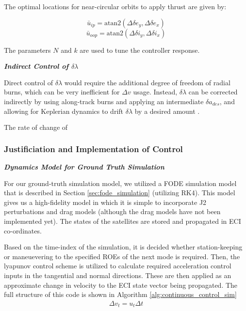The optimal locations for near-circular orbits to apply thrust are given by:

\[
\bar{u}_{ip} = \text{atan2} \left( \Delta \delta e_y, \Delta \delta e_x \right)
\]
\[
\bar{u}_{oop} = \text{atan2} \left( \Delta \delta i_y, \Delta \delta i_x \right)
\]

The parameters $N$ and $k$ are used to tune the controller response. 

\textbf{\textit{Indirect Control of $\delta\lambda$}}

Direct control of $\delta \lambda$ would require the additional degree of freedom of radial burns, which can be very inefficient for $\Delta v$ usage. Instead, $\delta \lambda$ can be corrected indirectly by using along-track burns and applying an intermediate $\delta a_{des}$, and allowing for Keplerian dynamics to drift $\delta \lambda$ by a desired amount \cite{steindorf2017constrained}.

The rate of change of 

\subsubsection{Justificiation and Implementation of Control}

\textbf{\textit{Dynamics Model for Ground Truth Simulation}}

For our ground-truth simulation model, we utilized a FODE simulation model that is described in Section \ref{sec:fode_simulation} (utilizing RK4). This model gives us a high-fidelity model in which it is simple to incorporate J2 perturbations and drag models (although the drag models have not been implemented yet). The states of the satellites are stored and propagated in ECI co-ordinates. 

Based on the time-index of the simulation, it is decided whether station-keeping or maneuevering to the specified ROEs of the next mode is required. Then, the lyapunov control scheme is utilized to calculate required acceleration control inputs in the tangential and normal directions. These are then applied as an approximate change in velocity to the ECI state vector being propagated. The full structure of this code is shown in Algorithm \ref{alg:continuous_control_sim}
\begin{align}
    \Delta v_t = u_t \Delta t
\end{align}

